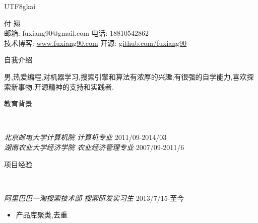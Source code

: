 \documentclass[9pt]{article}
\newenvironment{changemargin}[2]{%
  \begin{list}{}{%
    \setlength{\topsep}{0pt}%
    \setlength{\leftmargin}{#1}%
    \setlength{\rightmargin}{#2}%
    \setlength{\listparindent}{\parindent}%
    \setlength{\itemindent}{\parindent}%
    \setlength{\parsep}{\parskip}%
  }%
  \item[]}{\end{list}
}
\newcommand{\lineover}{
	\begin{changemargin}{-0.05in}{-0.05in}
		\vspace*{-8pt}
		\hrulefill \\
		\vspace*{-2pt}
	\end{changemargin}
}
\newcommand{\header}[1]{
	\begin{changemargin}{-0.5in}{-0.5in}
		\scshape{#1}\\
  	\lineover
	\end{changemargin}
}
\newcommand{\contact}[4]{
	\begin{changemargin}{-0.5in}{-0.5in}
		\begin{center}
			{\Large \scshape {#1}}\\ \smallskip
			{#2}\\ \smallskip 
			{#3}\\ \smallskip
			{#4}\smallskip
		\end{center}
	\end{changemargin}
}
\newenvironment{body} {
	\vspace*{-16pt}
	\begin{changemargin}{-0.25in}{-0.5in}
  }	
	{\end{changemargin}
}
\begin{document}
\begin{CJK}{UTF8}{gkai}
\contact{ 付 翔 }{邮箱: fuxiang90@gmail.com   电话: 18810542862 }{技术博客: \url{www.fuxiang90.com}  开源: \url{github.com/fuxiang90 } }


\header{自我介绍}

\begin{body}
	\vspace{14pt}
	男,热爱编程,对机器学习,搜索引擎和算法有浓厚的兴趣;有很强的自学能力,喜欢探索新事物.开源精神的支持和实践者.\\
\end{body}

\smallskip


\header{教育背景}

\begin{body}
	\vspace{14pt}
	\emph{北京邮电大学计算机院 计算机专业 } \hfill 2011/09-2014/03{} \\
  \medskip
	\emph{湖南农业大学经济学院 农业经济管理专业 } \hfill 2007/09-2011/6{} \\
\end{body}

\smallskip

\header{项目经验}

\begin{body}
	\vspace{14pt}
	
	
	\emph{阿里巴巴一淘搜索技术部 搜索研发实习生 }\hfill  {2013/7/15-至今}\\	
	\vspace*{-4pt}
	\begin{itemize} \itemsep -0pt  %
		\item  产品库聚类,去重

	\end{itemize}





\end{body}
\end{CJK}
\end{document}
